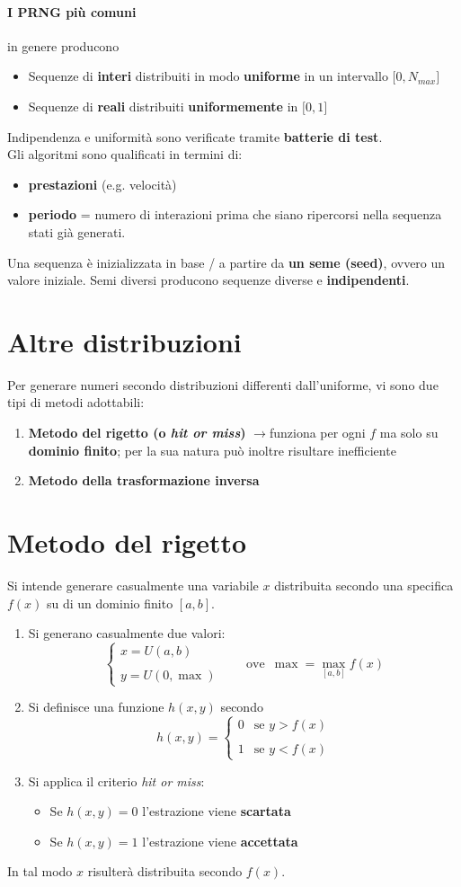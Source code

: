 \documentclass[10pt, oneside]{book}
\newcommand{\rarr}{$\rightarrow$}
\newcommand{\casess}[2]{
\begin{cases} 
\displaystyle #1 \\ \\ 
\displaystyle #2
\end{cases}
}
\begin{document}
\paragraph{I PRNG più comuni} in genere producono
\begin{itemize}
\item Sequenze di \textbf{interi} distribuiti in modo \textbf{uniforme} in un intervallo $\displaystyle \big[ 0, N_{max}\big]$
\item Sequenze di \textbf{reali} distribuiti \textbf{uniformemente} in $\displaystyle \big[ 0,1\big]$
\end{itemize}
Indipendenza e uniformità sono verificate tramite \textbf{batterie di test}.\\
Gli algoritmi sono qualificati in termini di:
\begin{itemize}
\item \textbf{prestazioni} (e.g. velocità)
\item \textbf{periodo} = numero di interazioni prima che siano ripercorsi nella sequenza stati già generati.
\end{itemize}
Una sequenza è inizializzata in base / a partire da \textbf{un seme (seed)}, ovvero un valore iniziale. Semi diversi producono sequenze diverse e \textbf{indipendenti}.

\section{Altre distribuzioni}
Per generare numeri secondo distribuzioni differenti dall'uniforme, vi sono due tipi di metodi adottabili:
\begin{enumerate}
\item \textbf{Metodo del rigetto (o \textit{hit or miss})} \rarr funziona per ogni $f$ ma solo su \textbf{dominio finito}; per la sua natura può inoltre risultare inefficiente
\item \textbf{Metodo della trasformazione inversa}
\end{enumerate}

\section{Metodo del rigetto}
Si intende generare casualmente una variabile $x$ distribuita secondo una specifica $f(x)$ su di un dominio finito $[a,b]$.
\begin{enumerate}
\item Si generano casualmente due valori:
\[\casess{x = U(a,b)}{y = U(0, \max)} \qquad \textrm{ove } \, \max = \max\limits_{[a,b]} f(x)\]
\item Si definisce una funzione $h(x,y)$ secondo
\[h(x,y) = \casess{0 & \textrm{se } y > f(x)}{1 & \textrm{se } y < f(x)}\]
\item Si applica il criterio \textit{hit or miss}:
\begin{itemize}
\item Se $h(x,y) = 0$ l'estrazione viene \textbf{scartata}
\item Se $h(x,y) = 1$ l'estrazione viene \textbf{accettata}
\end{itemize}
\end{enumerate}
In tal modo $x$ risulterà distribuita secondo $f(x)$.
\end{document}
